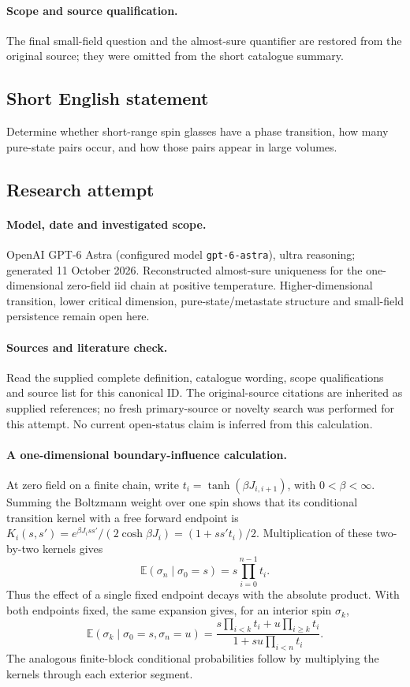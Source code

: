 \documentclass[11pt]{article}
\begin{document}
\paragraph{Scope and source qualification.}The final small-field question and the almost-sure quantifier are restored from the original source; they were omitted from the short catalogue summary.
\subsection{Short English statement}
Determine whether short-range spin glasses have a phase transition, how many pure-state pairs occur, and how those pairs appear in large volumes.
\subsection{Research attempt}
\paragraph{Model, date and investigated scope.}
OpenAI GPT-6 Astra (configured model \texttt{gpt-6-astra}), ultra reasoning; generated 11 October 2026. Reconstructed almost-sure uniqueness for the one-dimensional zero-field iid chain at positive temperature. Higher-dimensional transition, lower critical dimension, pure-state/metastate structure and small-field persistence remain open here.

\paragraph{Sources and literature check.}
Read the supplied complete definition, catalogue wording, scope qualifications and source list for this canonical ID. The original-source citations are inherited as supplied references; no fresh primary-source or novelty search was performed for this attempt. No current open-status claim is inferred from this calculation.

\paragraph{A one-dimensional boundary-influence calculation.}At zero field on a finite chain, write \(t_i=\tanh(\beta J_{i,i+1})\), with \(0<\beta<\infty\). Summing the Boltzmann weight over one spin shows that its conditional transition kernel with a free forward endpoint is \(K_i(s,s')=e^{\beta J_i ss'}/(2\cosh\beta J_i)=(1+ss't_i)/2\). Multiplication of these two-by-two kernels gives
\[\mathbb E(\sigma_n\mid\sigma_0=s)=s\prod_{i=0}^{n-1}t_i.\]
Thus the effect of a single fixed endpoint decays with the absolute product. With both endpoints fixed, the same expansion gives, for an interior spin \(\sigma_k\),
\[\mathbb E(\sigma_k\mid\sigma_0=s,\sigma_n=u)=
\frac{s\prod_{i<k}t_i+u\prod_{i\ge k}t_i}{1+su\prod_{i<n}t_i}.
\]
The analogous finite-block conditional probabilities follow by multiplying the kernels through each exterior segment.
\end{document}
